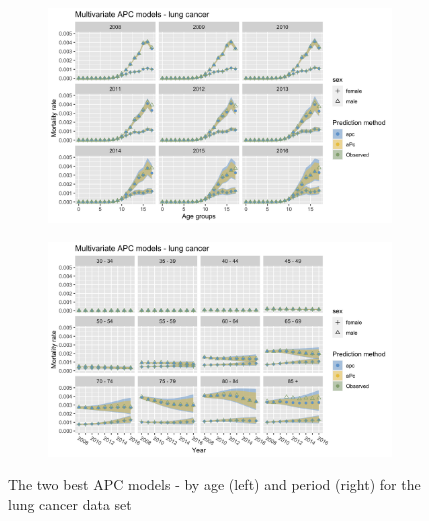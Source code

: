 \begin{figure}[h!]
    \centering
    \begin{subfigure}[b]{.45\linewidth}
        \includegraphics[width=\linewidth]{real-data/real-data-multivariate/Figures/multivariate-APC-by-age-lung.png}
    \end{subfigure}
    \begin{subfigure}[b]{.45\linewidth}
        \includegraphics[width=\linewidth]{real-data/real-data-multivariate/Figures/multivariate-APC-by-period-lung.png}
    \end{subfigure}
    \caption{The two best APC models - by age (left) and period (right) for the lung cancer data set}
    \label{fig:mv-APC-lung}
\end{figure}

